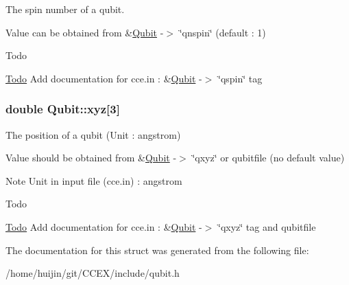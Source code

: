 The spin number of a qubit. 

Value can be obtained from \&\hyperlink{structQubit}{Qubit} -\/$>$ \char`\"{}qnspin\char`\"{} (default \-: 1) \begin{DoxyRefDesc}{Todo}
\item[\hyperlink{todo__todo000018}{Todo}]Add documentation for cce.\-in \-: \&\hyperlink{structQubit}{Qubit} -\/$>$ \char`\"{}qspin\char`\"{} tag \end{DoxyRefDesc}
\hypertarget{structQubit_a799cb32b473160eb8e9e4aa6c9c39b18}{
\subsubsection[{xyz}]{\setlength{\rightskip}{0pt plus 5cm}double Qubit\-::xyz\mbox{[}3\mbox{]}}}\label{structQubit_a799cb32b473160eb8e9e4aa6c9c39b18}


The position of a qubit (Unit \-: angstrom) 

Value should be obtained from \&\hyperlink{structQubit}{Qubit} -\/$>$ \char`\"{}qxyz\char`\"{} or qubitfile (no default value) \begin{DoxyNote}{Note}
Unit in input file (cce.\-in) \-: angstrom 
\end{DoxyNote}
\begin{DoxyRefDesc}{Todo}
\item[\hyperlink{todo__todo000020}{Todo}]Add documentation for cce.\-in \-: \&\hyperlink{structQubit}{Qubit} -\/$>$ \char`\"{}qxyz\char`\"{} tag and qubitfile \end{DoxyRefDesc}


The documentation for this struct was generated from the following file\-:\begin{DoxyCompactItemize}
\item 
/home/huijin/git/\-C\-C\-E\-X/include/qubit.\-h\end{DoxyCompactItemize}
